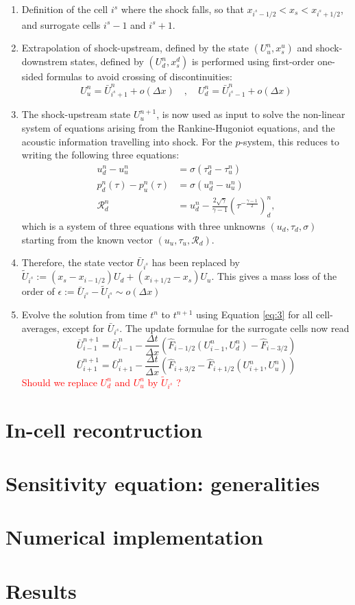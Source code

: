\documentclass[10pt]{article}
\begin{document}
\begin{enumerate}
\item Definition of the cell $i^s$ where the shock falls, so that $x_{i^s-1/2}<x_s<x_{i^s+1/2}$, and surrogate cells $i^s-1$ and $i^s+1$.
\item Extrapolation of shock-upstream, defined by the state $(U^n_u, x_s^u)$ and shock-downstrem states, defined by $(U^n_d, x_s^d)$ 
is performed using first-order one-sided formulas to avoid crossing of discontinuities:
$$  U^n_u = \bar U^n_{i^s+1} + o(\Delta x) \quad , \quad U^n_d = \bar U^n_{i^s-1} + o(\Delta x) $$ 
\item The shock-upstream state $U^{n+1}_u$, is now used as input to solve the non-linear system of equations arising from the 
Rankine-Hugoniot equations, and the acoustic information travelling into shock. For the $p$-system, this reduces to writing  
the following three equations:
\begin{align*}
u^n_d - u^n_u &= \sigma (\tau^n_d - \tau^n_u) \\
p^n_d(\tau) - p^n_u(\tau) &= \sigma (u^n_d - u^n_u) \\
\mathcal{R}^n_d &= u^n_d - \frac{2\sqrt{\gamma}}{\gamma-1}(\tau^{-\frac{\gamma-1}{2}})^n_d, 
\end{align*}
which is a system of three equations with three unknowns $(u_d,\tau_d,\sigma)$ starting from the known vector $(u_u,\tau_u,\mathcal{R}_d)$.
\item Therefore, the state vector $\bar U_{i^s}$ has been replaced by $\tilde U_{i^s}:=(x_s - x_{i-1/2})U_d + (x_{i+1/2}-x_s)U_u$. This gives a mass loss of the order of
$\epsilon:=\bar U_{i^s}-\tilde U_{i^s}\sim o(\Delta x)$
\item Evolve the solution from time $t^n$ to $t^{n+1}$ using Equation \eqref{eq:3} for all cell-averages, except for $\bar U_{i^s}$.
The update formulae for the surrogate cells now read 
$$ \bar U^{n+1}_{i-1} = \bar U^{n}_{i-1} - \dfrac{\Delta t}{\Delta x}\left(\hat F_{i-1/2}(U^n_{i-1},U^n_d)  -  \hat F_{i-3/2}\right) $$
$$ \bar U^{n+1}_{i+1} = \bar U^{n}_{i+1} - \dfrac{\Delta t}{\Delta x}\left(\hat F_{i+3/2}  -  \hat F_{i+1/2}(U^n_{i+1},U^n_u)\right) $$
\textcolor{red}{Should we replace $U^n_d$ and $U^n_u$ by $\tilde U_{i^s}$ ?}
\end{enumerate}

\section{In-cell recontruction}
 
\section{Sensitivity equation: generalities}

\section{Numerical implementation}

\section{Results}


 

 
\end{document}
